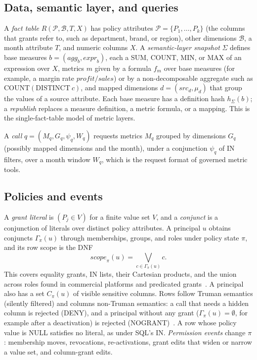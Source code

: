 \documentclass[sigconf, nonacm]{acmart}
\newcommand{\M}[1]{\textsf{#1}}
\newcommand{\scope}{\mathit{scope}}
\begin{document}
\subsection{Data, semantic layer, and queries}
A \emph{fact table} $R(\mathcal{P}, \mathcal{B}, T, X)$ has policy attributes $\mathcal{P}=\{P_1,\dots,P_k\}$ (the columns that grants refer to, such as department, brand, or region), other dimensions $\mathcal{B}$, a month attribute $T$, and numeric columns $X$. A \emph{semantic-layer snapshot} $\Sigma$ defines base measures $b=(\mathit{agg}_b, \mathit{expr}_b)$, each a SUM, COUNT, MIN, or MAX of an expression over $X$, metrics $m$ given by a formula $f_m$ over base measures (for example, a margin rate $\mathit{profit}/\mathit{sales}$) or by a non-decomposable aggregate such as $\mathrm{COUNT}(\mathrm{DISTINCT}\ c)$, and mapped dimensions $d=(\mathit{src}_d,\mu_d)$ that group the values of a source attribute. Each base measure has a definition hash $h_\Sigma(b)$; a \emph{republish} replaces a measure definition, a metric formula, or a mapping. This is the single-fact-table model of metric layers.

A \emph{call} $q=(M_q, G_q, \psi_q, W_q)$ requests metrics $M_q$ grouped by dimensions $G_q$ (possibly mapped dimensions and the month), under a conjunction $\psi_q$ of IN filters, over a month window $W_q$, which is the request format of governed metric tools.

\subsection{Policies and events}
A \emph{grant literal} is $(P_j \in V)$ for a finite value set $V$, and a \emph{conjunct} is a conjunction of literals over distinct policy attributes. A principal $u$ obtains conjuncts $\Gamma_\pi(u)$ through memberships, groups, and roles under policy state $\pi$, and its row scope is the DNF
\[
\scope_\pi(u)=\bigvee_{c\in\Gamma_\pi(u)} c .
\]
This covers equality grants, IN lists, their Cartesian products, and the union across roles found in commercial platforms and predicated grants~\cite{chaudhuri07}. A principal also has a set $C_\pi(u)$ of visible sensitive columns. Rows follow Truman semantics (silently filtered) and columns non-Truman semantics: a call that needs a hidden column is rejected (\M{DENY}), and a principal without any grant ($\Gamma_\pi(u)=\emptyset$, for example after a deactivation) is rejected (\M{NOGRANT})~\cite{rizvi04}. A row whose policy value is NULL satisfies no literal, as under SQL's IN. \emph{Permission events} change $\pi$: membership moves, revocations, re-activations, grant edits that widen or narrow a value set, and column-grant edits.
\end{document}
